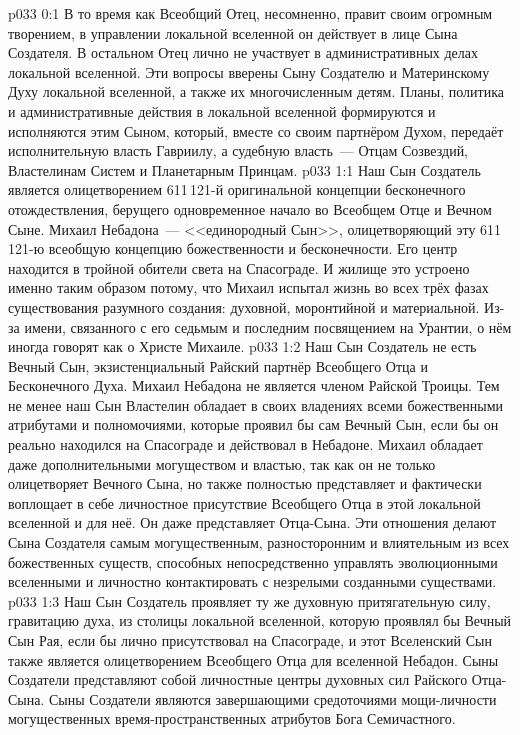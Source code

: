 \author{Глава архангелов}
\vs p033 0:1 В то время как Всеобщий Отец, несомненно, правит своим огромным творением, в управлении локальной вселенной он действует в лице Сына Создателя. В остальном Отец лично не участвует в административных делах локальной вселенной. Эти вопросы вверены Сыну Создателю и Материнскому Духу локальной вселенной, а также их многочисленным детям. Планы, политика и административные действия в локальной вселенной формируются и исполняются этим Сыном, который, вместе со своим партнёром Духом, передаёт исполнительную власть Гавриилу, а судебную власть~--- Отцам Созвездий, Властелинам Систем и Планетарным Принцам.
\vs p033 1:1 Наш Сын Создатель является олицетворением 611\,121-й оригинальной концепции бесконечного отождествления, берущего одновременное начало во Всеобщем Отце и Вечном Сыне. Михаил Небадона~--- <<единородный Сын>>, олицетворяющий эту 611\,121-ю всеобщую концепцию божественности и бесконечности. Его центр находится в тройной обители света на Спасограде. И жилище это устроено именно таким образом потому, что Михаил испытал жизнь во всех трёх фазах существования разумного создания: духовной, моронтийной и материальной. Из\hyp{}за имени, связанного с его седьмым и последним посвящением на Урантии, о нём иногда говорят как о Христе Михаиле.
\vs p033 1:2 Наш Сын Создатель не есть Вечный Сын, экзистенциальный Райский партнёр Всеобщего Отца и Бесконечного Духа. Михаил Небадона не является членом Райской Троицы. Тем не менее наш Сын Властелин обладает в своих владениях всеми божественными атрибутами и полномочиями, которые проявил бы сам Вечный Сын, если бы он реально находился на Спасограде и действовал в Небадоне. Михаил обладает даже дополнительными могуществом и властью, так как он не только олицетворяет Вечного Сына, но также полностью представляет и фактически воплощает в себе личностное присутствие Всеобщего Отца в этой локальной вселенной и для неё. Он даже представляет Отца\hyp{}Сына. Эти отношения делают Сына Создателя самым могущественным, разносторонним и влиятельным из всех божественных существ, способных непосредственно управлять эволюционными вселенными и личностно контактировать с незрелыми созданными существами.
\vs p033 1:3 Наш Сын Создатель проявляет ту же духовную притягательную силу, гравитацию духа, из столицы локальной вселенной, которую проявлял бы Вечный Сын Рая, если бы лично присутствовал на Спасограде, и  этот Вселенский Сын также является олицетворением Всеобщего Отца для вселенной Небадон. Сыны Создатели представляют собой личностные центры духовных сил Райского Отца\hyp{}Сына. Сыны Создатели являются завершающими средоточиями мощи\hyp{}личности могущественных время\hyp{}пространственных атрибутов Бога Семичастного.
